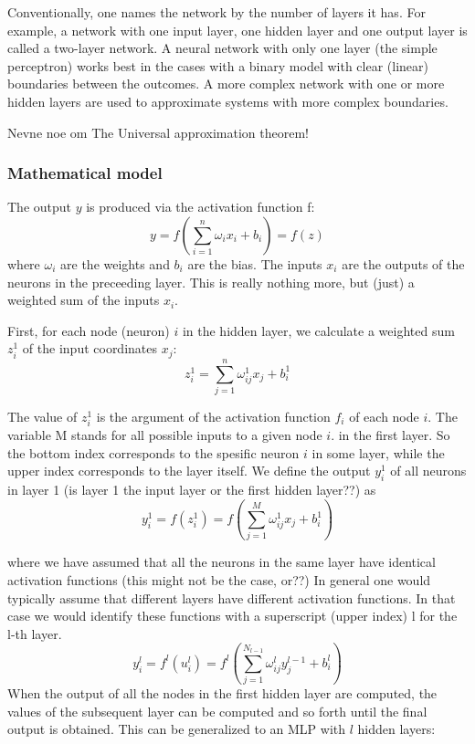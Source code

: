\documentclass[a4paper,12pt]{article}
\begin{document}
Conventionally, one names the network by the number of layers it has. For example, a network with one input layer, one hidden layer and one output layer is called a two-layer network. A neural network with only one layer (the simple perceptron) works best in the cases with a binary model with clear (linear) boundaries between the outcomes. A more complex network with one or more hidden layers are used to approximate systems with more complex boundaries.

Nevne noe om The Universal approximation theorem!


\subsubsection{Mathematical model}
The output $y$ is produced via the activation function f:
\begin{equation}
    y = f( \sum_{i=1}^n{\omega_i x_i + b_i} ) = f(z)
\end{equation}
where $\omega_i$ are the weights and $b_i$ are the bias. The inputs $x_i$ are the outputs of the neurons in the preceeding layer.\newline
This is really nothing more, but (just) a weighted sum of the inputs $x_i$.\newline

First, for each node (neuron) $i$ in the hidden layer, we calculate a weighted sum $z_i^1$ of the input coordinates $x_j$:
\begin{equation}
    z_i^1 = \sum_{j=1}^n \omega_{ij}^1 x_j + b_i^1
\end{equation}

The value of $z_i^1$ is the argument of the activation function $f_i$ of each node $i$. The variable M stands for all possible inputs to a given node $i$. in the first layer. So the bottom index corresponds to the spesific neuron $i$ in some layer, while the upper index corresponds to the layer itself. We define the output $y_i^1$ of all neurons in layer 1 (is layer 1 the input layer or the first hidden layer??) as
\begin{equation}
    y_i^1 = f(z_i^1) = f( \sum_{j=1}^M \omega_{ij}^1 x_j + b_i^1 )
\end{equation}

where we have assumed that all the neurons in the same layer have identical activation functions (this might not be the case, or??) In general one would typically assume that different layers have different activation functions. In that case we would identify these functions with a superscript (upper index) l for the l-th layer.
\begin{equation}
    y_i^l = f^l(u_i^l) = f^l( \sum_{j=1}^{N_{l-1}} \omega_{ij}^l y_j^{l-1} + b_i^l )
\end{equation}
When the output of all the nodes in the first hidden layer are computed, the values of the subsequent layer can be computed and so forth until the final output is obtained.\newline
This can be generalized to an MLP with $l$ hidden layers:
\end{document}
